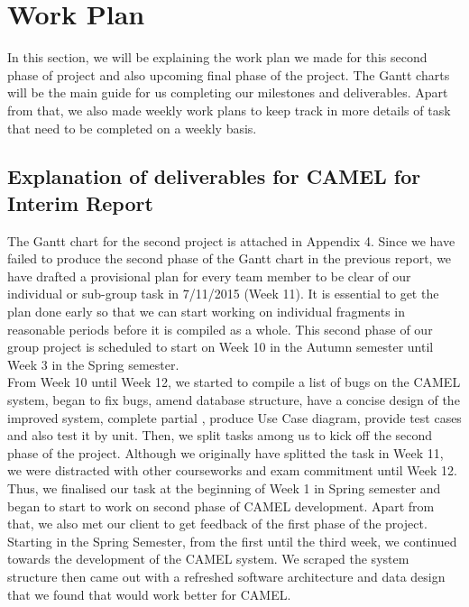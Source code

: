 \section{Work Plan}
In this section, we will be explaining the work plan we made for this second phase of project and also upcoming final phase of the project. The Gantt charts will be the main guide for us completing our milestones and deliverables. Apart from that, we also made weekly work plans to keep track in more details of task that need to be completed on a weekly basis.

\subsection*{Explanation of deliverables for CAMEL for Interim Report}

The Gantt chart for the second project is attached in Appendix 4. Since we have failed to produce the second phase of the Gantt chart in the previous report, we have drafted a provisional plan for every team member to be clear of our individual or sub-group task in 7/11/2015 (Week 11). It is essential to get the plan done early so that we can start working on individual fragments in reasonable periods before it is compiled as a whole. This second phase of our group project is scheduled to start on Week 10 in the Autumn semester until Week 3 in the Spring semester.\\

 From Week 10 until Week 12, we started to compile a list of bugs on the CAMEL system, began to fix bugs, amend database structure, have a concise design of the improved system, complete partial , produce Use Case diagram, provide test cases and also test it by unit. Then, we split tasks among us to kick off the second phase of the project. Although we originally have splitted the task in Week 11, we were distracted with other courseworks and exam commitment until Week 12. Thus, we finalised our task at the beginning of Week 1 in Spring semester and began to start to work on second phase of CAMEL development.   Apart from that, we also met our client to get feedback of the first phase of the project. Starting in the Spring Semester, from the first until the third week, we continued towards the development of the CAMEL system. We scraped the system structure then came out with a refreshed software architecture and data design that we found that would work better for CAMEL.\\
 
